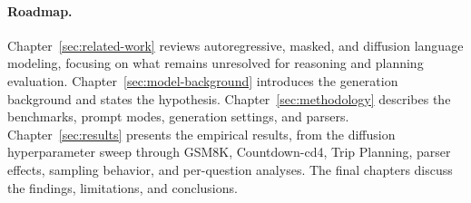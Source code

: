 \paragraph{Roadmap.}
Chapter~\ref{sec:related-work} reviews autoregressive, masked, and diffusion
language modeling, focusing on what remains unresolved for reasoning and
planning evaluation. Chapter~\ref{sec:model-background} introduces the
generation background and states the hypothesis. Chapter~\ref{sec:methodology}
describes the benchmarks, prompt modes, generation settings, and parsers.
Chapter~\ref{sec:results} presents the empirical results, from the diffusion
hyperparameter sweep through GSM8K, Countdown-cd4, Trip Planning, parser
effects, sampling behavior, and per-question analyses. The final chapters
discuss the findings, limitations, and conclusions.
